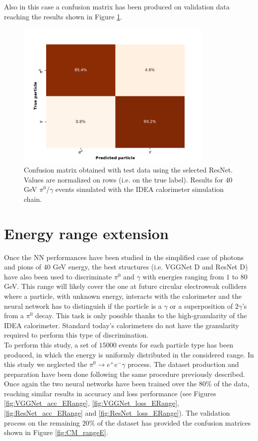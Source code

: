 Also in this case a confusion matrix has been produced on validation data reaching the results shown in Figure \ref{fig:ResNet-cm}.

\begin{figure}
	\centering
	\includegraphics[width=0.85\textwidth]{IMG/Cap6/ResNet-D_ConfMatrix.pdf}
	\caption{Confusion matrix obtained with test data  using the selected ResNet. Values are normalized on rows (i.e. on the true label). Results for $40$ GeV $\pi^0/\gamma$ events simulated with the IDEA calorimeter simulation chain.}
	\label{fig:ResNet-cm}
\end{figure}

\section{Energy range extension}
Once the NN performances have been studied in the simplified case of photons and pions of $40$ GeV energy, the best structures (i.e. VGGNet D and ResNet D) have also been used to discriminate $\pi^0$ and $\gamma$ with energies ranging from $1$ to $80$ GeV.
This range will likely cover the one at future circular electroweak colliders where a particle, with unknown energy, interacts with the calorimeter and the neural network has to distinguish if the particle is a $\gamma$ or a superposition of $2\gamma$'s from a $\pi^0$ decay.
This task is only possible thanks to the high-granularity of the IDEA calorimeter. Standard today's calorimeters do not have the granularity required to perform this type of discrimination.\\

To perform this study, a set of $15000$ events for each particle type has been produced, in which the energy is uniformly distributed in the considered range. In this study we neglected the $\pi^0 \rightarrow e^+e^-\gamma$ process. 
The dataset production and preparation have been done following the same procedure previously described.\\
Once again the two neural networks have been trained over the $80\%$ of the data, reaching similar results in accuracy and loss performance (see Figures \ref{fig:VGGNet_acc_ERange}, \ref{fig:VGGNet_loss_ERange}, \ref{fig:ResNet_acc_ERange} and \ref{fig:ResNet_loss_ERange}). The validation process on the remaining $20\%$ of the dataset has provided the confusion matrices shown in Figure \ref{fig:CM_rangeE}.

